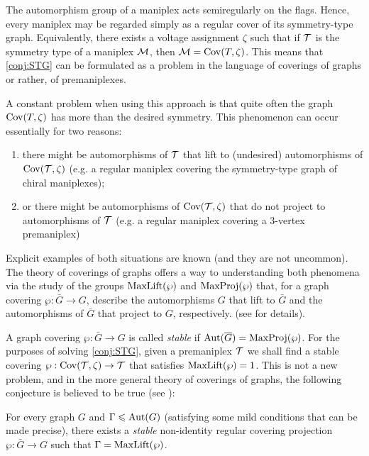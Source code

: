 The automorphism group of a maniplex acts semiregularly on the flags.
Hence, every maniplex may be regarded simply as a regular cover of its symmetry-type graph. 
Equivalently, there exists a voltage assignment $\zeta$ such that if $\mathcal{T}$ is the symmetry type of a maniplex $\mathcal{M}$, then $\mathcal{M} = \operatorname{Cov}(T,\zeta)$.
This means that \cref{conj:STG} can be formulated as a problem in the language of coverings of graphs or rather, of premaniplexes.


A constant problem when using this approach is that quite often the graph $\operatorname{Cov}(T, \zeta)$ has more than the desired symmetry. 
This phenomenon can occur essentially for two reasons:
\begin{enumerate}[label=\textit{\roman*)}]
  \item there might be automorphisms of $\mathcal{T}$ that lift to (undesired) automorphisms of $\operatorname{Cov}(\mathcal{T},\zeta)$ (e.g. a regular maniplex covering the symmetry-type graph of chiral maniplexes);
  \item or there might be automorphisms of $\operatorname{Cov}(\mathcal{T},\zeta)$ that do not project to automorphisms of $\mathcal{T}$ (e.g. a regular maniplex covering a $3$-vertex premaniplex) 
\end{enumerate}

Explicit examples of both situations are known  (and they are not uncommon). 
The theory of coverings of graphs offers a way to understanding both phenomena via the study of the groups $\operatorname{MaxLift}(\wp)$ and $\operatorname{MaxProj}(\wp)$ that, for a graph covering $\wp: \bar{G} \to G$, describe the automorphisms $G$ that lift to $\bar{G}$ and the automorphisms of $\bar{G}$ that project to $G$, respectively. (see \cite{MalniPozar2016_SplitStructureLifted,MalniPozar2019_SplitLiftingsSectional,MalnMarPot2004_ElementaryAbelianCovers,MalnNedSko2000_LiftingGraphAutomorphisms} for details).

A graph covering $\wp: \bar{G} \to G$ is called \emph{stable} if $\operatorname{Aut}(\overline{G}) = \operatorname{MaxProj}(\wp)$. 
For the purposes of solving \cref{conj:STG}, given a premaniplex $\mathcal{T}$ we shall find a stable covering $\wp: \operatorname{Cov}(\mathcal{T}, \zeta) \to \mathcal{T}$ that satisfies $\operatorname{MaxLift}(\wp) = 1$. 
This is not a new problem, and in the more general theory of coverings of graphs,  the following conjecture is believed to be true (see \cite{PotocSpiga2019_LiftingPrescribedGroup}):

\begin{conj}\label{conj:covers}
  For every graph $G$  and $\Gamma \leqslant \operatorname{Aut}(G)$ (satisfying some mild conditions that can be made precise), there exists a \emph{ stable} non-identity regular covering projection $\wp \colon \bar{G} \to G$ 
such that $\Gamma = \operatorname{MaxLift}(\wp)$.
\end{conj}

